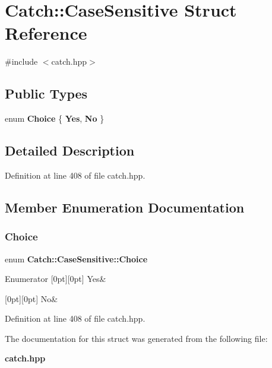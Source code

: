 \section{Catch\+::Case\+Sensitive Struct Reference}
\label{struct_catch_1_1_case_sensitive}


{\ttfamily \#include $<$catch.\+hpp$>$}

\subsection*{Public Types}
\begin{DoxyCompactItemize}
\item 
enum \textbf{ Choice} \{ \textbf{ Yes}, 
\textbf{ No}
 \}
\end{DoxyCompactItemize}


\subsection{Detailed Description}


Definition at line 408 of file catch.\+hpp.



\subsection{Member Enumeration Documentation}
\mbox{\label{struct_catch_1_1_case_sensitive_aad49d3aee2d97066642fffa919685c6a}} 
\subsubsection{Choice}
{\footnotesize\ttfamily enum \textbf{ Catch\+::\+Case\+Sensitive\+::\+Choice}}

\begin{DoxyEnumFields}{Enumerator}
[0pt][0pt]{}\mbox{\label{struct_catch_1_1_case_sensitive_aad49d3aee2d97066642fffa919685c6aa7c5550b69ec3c502e6f609b67f9613c6}} 
Yes&\\
\hline

[0pt][0pt]{}\mbox{\label{struct_catch_1_1_case_sensitive_aad49d3aee2d97066642fffa919685c6aa4ffff8d29b481f0116abc37228cd53f6}} 
No&\\
\hline

\end{DoxyEnumFields}


Definition at line 408 of file catch.\+hpp.



The documentation for this struct was generated from the following file\+:\begin{DoxyCompactItemize}
\item 
\textbf{ catch.\+hpp}\end{DoxyCompactItemize}
